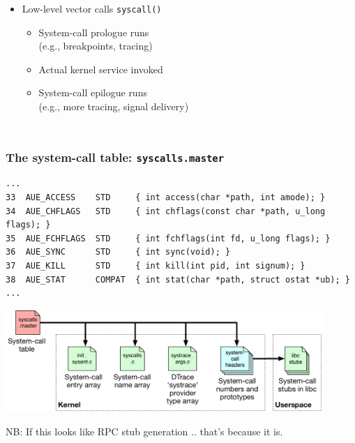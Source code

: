 \begin{frame}
\begin{columns}[T]
\begin{itemize}
	\pause
	\medskip

	\item Low-level vector calls \texttt{syscall()}
	\begin{itemize}
	  \item System-call prologue runs \\
	    (e.g., breakpoints, tracing)
	  \item Actual kernel service invoked
	  \item System-call epilogue runs \\
	    (e.g., more tracing, signal delivery)
	\end{itemize}
      \end{itemize}
  \end{columns}
\end{frame}

\begin{frame}[fragile]
  \frametitle{The system-call table: \texttt{syscalls.master}}

  \begin{scriptsize}
\begin{verbatim}
...
33  AUE_ACCESS    STD     { int access(char *path, int amode); }
34  AUE_CHFLAGS   STD     { int chflags(const char *path, u_long flags); }
35  AUE_FCHFLAGS  STD     { int fchflags(int fd, u_long flags); }
36  AUE_SYNC      STD     { int sync(void); }
37  AUE_KILL      STD     { int kill(int pid, int signum); }
38  AUE_STAT      COMPAT  { int stat(char *path, struct ostat *ub); }
...
\end{verbatim}
  \end{scriptsize}

  \pause

  \begin{center}
    \includegraphics[width=0.9\textwidth]{../../figures/syscall-table-output.pdf}
  \end{center}

  \pause

  NB: If this looks like RPC stub generation .. that's because it is.
\end{frame}

